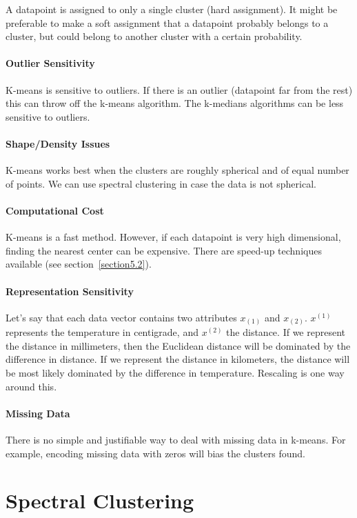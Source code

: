 A datapoint is assigned to only a single cluster (hard assignment). It might be preferable to make a soft assignment that a datapoint probably belongs to a cluster, but could belong to another cluster with a certain probability. 

\paragraph{Outlier Sensitivity}

K-means is sensitive to outliers. If there is an outlier (datapoint far from the rest) this can throw off the k-means algorithm. The k-medians algorithms can be less sensitive to outliers.

\paragraph{Shape/Density Issues}

K-means works best when the clusters are roughly spherical and of equal number of points. We can use spectral clustering in case the data is not spherical.

\paragraph{Computational Cost}

K-means is a fast method. However, if each datapoint is very high dimensional, finding the nearest center can be expensive. There are speed-up techniques available (see section~\ref{section5.2}).

\paragraph{Representation Sensitivity}

Let's say that each data vector contains two attributes $x_{(1)}$ and $x_{(2)}$. $x^{(1)}$ represents the temperature in centigrade, and $x^{(2)}$ the distance. If we represent the distance in millimeters, then the Euclidean distance will be dominated by the difference in distance. If we represent the distance in kilometers, the distance will be most likely dominated by the difference in temperature. Rescaling is one way around this.

\paragraph{Missing Data}

There is no simple and justifiable way to deal with missing data in k-means. For example, encoding missing data with zeros will bias the clusters found.



\section{Spectral Clustering}